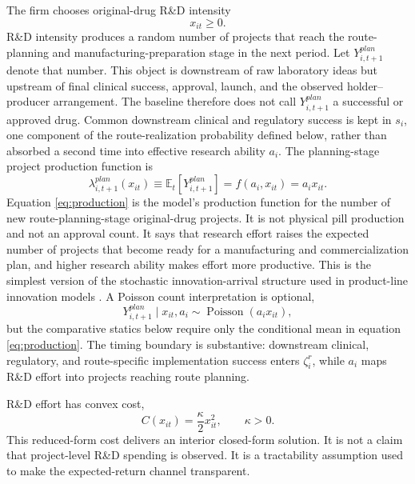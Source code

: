 \documentclass[12pt]{article}
\newcommand{\E}{\mathbb{E}}
\newcommand{\1}{\mathbf{1}}
\begin{document}
The firm chooses original-drug R\&D intensity
\begin{equation}
    x_{it}\ge0.
    \label{eq:rdintensity}
\end{equation}
R\&D intensity produces a random number of projects that reach the route-planning and manufacturing-preparation stage in the next period. Let $Y_{i,t+1}^{plan}$ denote that number. This object is downstream of raw laboratory ideas but upstream of final clinical success, approval, launch, and the observed holder--producer arrangement. The baseline therefore does not call $Y_{i,t+1}^{plan}$ a successful or approved drug. Common downstream clinical and regulatory success is kept in $s_i$, one component of the route-realization probability defined below, rather than absorbed a second time into effective research ability $a_i$. The planning-stage project production function is
\begin{equation}
    \lambda_{i,t+1}^{plan}(x_{it})
    \equiv \E_t[Y_{i,t+1}^{plan}]
    =f(a_i,x_{it})=a_i x_{it}.
    \label{eq:production}
\end{equation}
Equation \eqref{eq:production} is the model's production function for the number of new route-planning-stage original-drug projects. It is not physical pill production and not an approval count. It says that research effort raises the expected number of projects that become ready for a manufacturing and commercialization plan, and higher research ability makes effort more productive. This is the simplest version of the stochastic innovation-arrival structure used in product-line innovation models \citep{KletteKortum2004}. A Poisson count interpretation is optional,
\begin{equation}
    Y_{i,t+1}^{plan}\mid x_{it},a_i
    \sim \operatorname{Poisson}(a_i x_{it}),
    \label{eq:poisson}
\end{equation}
but the comparative statics below require only the conditional mean in equation \eqref{eq:production}. The timing boundary is substantive: downstream clinical, regulatory, and route-specific implementation success enters $\zeta_i^r$, while $a_i$ maps R\&D effort into projects reaching route planning.

R\&D effort has convex cost,
\begin{equation}
    C(x_{it})=\frac{\kappa}{2}x_{it}^2,\qquad \kappa>0.
    \label{eq:rdcost}
\end{equation}
This reduced-form cost delivers an interior closed-form solution. It is not a claim that project-level R\&D spending is observed. It is a tractability assumption used to make the expected-return channel transparent.
\end{document}

